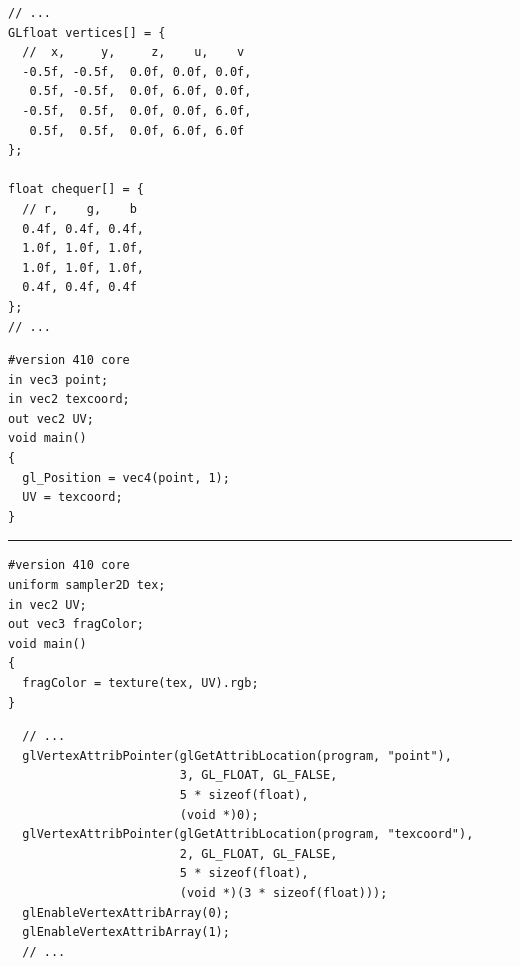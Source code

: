 \documentclass[calcdimensions,landscape,letterpaper]{powersem}
\newcommand{\thecurrentheading}{}
\newcommand{\heading}[1]{\renewcommand{\thecurrentheading}{#1}}
\begin{document}
\begin{slide}
    \heading{Textures: Coordinates and Pixels}
    \begin{center}
        \begin{minipage}[c]{.7\textwidth}
            \begin{verbatim}
// ...
GLfloat vertices[] = {
  //  x,     y,     z,    u,    v
  -0.5f, -0.5f,  0.0f, 0.0f, 0.0f,
   0.5f, -0.5f,  0.0f, 6.0f, 0.0f,
  -0.5f,  0.5f,  0.0f, 0.0f, 6.0f,
   0.5f,  0.5f,  0.0f, 6.0f, 6.0f
};

float chequer[] = {
  // r,    g,    b
  0.4f, 0.4f, 0.4f,
  1.0f, 1.0f, 1.0f,
  1.0f, 1.0f, 1.0f,
  0.4f, 0.4f, 0.4f
};
// ...
            \end{verbatim}
        \end{minipage}
    \end{center}
\end{slide}

\begin{slide}
    \heading{Textures: Shaders}
    \begin{center}
        \begin{minipage}[c]{.5\textwidth}
            \begin{verbatim}
#version 410 core
in vec3 point;
in vec2 texcoord;
out vec2 UV;
void main()
{
  gl_Position = vec4(point, 1);
  UV = texcoord;
}
            \end{verbatim}
            \vspace{-10pt}
            \rule{4cm}{0.4pt}
            \begin{verbatim}
#version 410 core
uniform sampler2D tex;
in vec2 UV;
out vec3 fragColor;
void main()
{
  fragColor = texture(tex, UV).rgb;
}
            \end{verbatim}
        \end{minipage}
    \end{center}
\end{slide}

\begin{slide}
    \heading{Textures: Multiple Vertex Attributes}
    \begin{center}
        \begin{minipage}[c]{.95\textwidth}
            \begin{verbatim}
  // ...
  glVertexAttribPointer(glGetAttribLocation(program, "point"),
                        3, GL_FLOAT, GL_FALSE,
                        5 * sizeof(float),
                        (void *)0);
  glVertexAttribPointer(glGetAttribLocation(program, "texcoord"),
                        2, GL_FLOAT, GL_FALSE,
                        5 * sizeof(float),
                        (void *)(3 * sizeof(float)));
  glEnableVertexAttribArray(0);
  glEnableVertexAttribArray(1);
  // ...
            \end{verbatim}
        \end{minipage}
    \end{center}
\end{slide}
\end{document}
